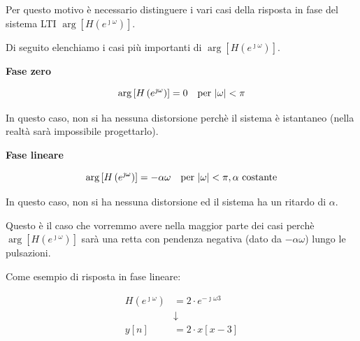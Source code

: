Per questo motivo è necessario distinguere i vari casi della risposta in fase del sistema LTI $\arg \left[ H \left( e^{\jmath \omega}\right)\right]$. \newline 

Di seguito elenchiamo i casi più importanti di $\arg \left[ H \left( e^{\jmath \omega}\right)\right]$. \newline 

\textbf{Fase zero} \newline 

{
    \Large 
    \begin{equation}
        \arg \left[ H \left( e^{\jmath \omega}\right)\right] 
        = 
        0 
        \quad 
        \text{per }
        \abs{\omega} < \pi
    \end{equation}
}

In questo caso, non si ha nessuna distorsione perchè il sistema è istantaneo (nella realtà sarà impossibile progettarlo). \newline 

\textbf{Fase lineare} \newline 

{
    \Large 
    \begin{equation}
        \arg \left[ H \left( e^{\jmath \omega}\right)\right] 
        = 
        - \alpha \omega
        \quad 
        \text{per }
        \abs{\omega} < \pi, \alpha \text{ costante}
    \end{equation}
}

In questo caso, non si ha nessuna distorsione ed il sistema ha un ritardo di $\alpha$. \newline

\begin{tcolorbox}
    Questo è il caso che vorremmo avere nella maggior parte dei casi perchè 
    $\arg \left[ H \left( e^{\jmath \omega}\right)\right] $ sarà una retta con pendenza negativa (dato da $- \alpha \omega$) lungo le pulsazioni. 
\end{tcolorbox}

Come esempio di risposta in fase lineare: 

{
    \Large 
    \begin{equation}
        \begin{split}
        H \left(e^{\jmath \omega}\right)
        &= 
        2 \cdot e^{- \jmath \omega 3}
        \\
        &\downarrow
        \\
        y \left[ n \right]
        &= 
        2 \cdot x \left[ x - 3\right]
        \end{split}
    \end{equation}
}

